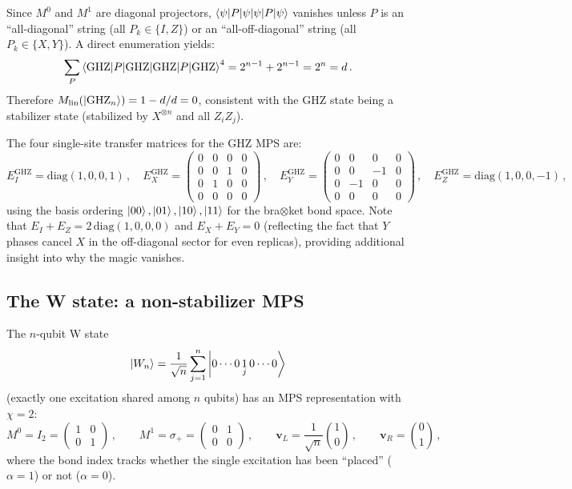 \documentclass[11pt,a4paper]{article}
\theoremstyle{definition}
\theoremstyle{remark}
\newcommand{\Mlin}{M_{\mathrm{lin}}}
\begin{document}
Since $M^0$ and $M^1$ are diagonal projectors, $\braket{\psi|P|\psi}$ vanishes unless $P$ is an ``all-diagonal'' string (all $P_k\in\{I,Z\}$) or an ``all-off-diagonal'' string (all $P_k\in\{X,Y\}$).
A direct enumeration yields:
\begin{equation}
  \sum_P \braket{\mathrm{GHZ}|P|\mathrm{GHZ}}^4 = 2^{n-1}+2^{n-1} = 2^n = d\,.
\end{equation}
Therefore $\Mlin(\ket{\mathrm{GHZ}_n}) = 1 - d/d = 0$, consistent with the GHZ state being a stabilizer state (stabilized by $X^{\otimes n}$ and all $Z_iZ_j$).

The four single-site transfer matrices for the GHZ MPS are:
\begin{equation}\label{eq:EP_GHZ}
  E_I^{\mathrm{GHZ}} = \mathrm{diag}(1,0,0,1)\,,\quad
  E_X^{\mathrm{GHZ}} = \begin{pmatrix} 0&0&0&0\\0&0&1&0\\0&1&0&0\\0&0&0&0\end{pmatrix}\,,\quad
  E_Y^{\mathrm{GHZ}} = \begin{pmatrix} 0&0&0&0\\0&0&-1&0\\0&-1&0&0\\0&0&0&0\end{pmatrix}\,,\quad
  E_Z^{\mathrm{GHZ}} = \mathrm{diag}(1,0,0,-1)\,,
\end{equation}
using the basis ordering $\ket{00},\ket{01},\ket{10},\ket{11}$ for the bra$\otimes$ket bond space.
Note that $E_I + E_Z = 2\,\mathrm{diag}(1,0,0,0)$ and $E_X + E_Y = 0$ (reflecting the fact that $Y$ phases cancel $X$ in the off-diagonal sector for even replicas), providing additional insight into why the magic vanishes.

\subsection{The W state: a non-stabilizer MPS}
\label{sec:W_state}

The $n$-qubit W state
\begin{equation}
  \ket{W_n} = \frac{1}{\sqrt{n}}\sum_{j=1}^n \ket{0\cdots 0\,\underset{j}{1}\,0\cdots 0}
\end{equation}
(exactly one excitation shared among $n$ qubits) has an MPS representation with $\chi=2$:
\begin{equation}\label{eq:W_mps}
  M^0 = I_2 = \begin{pmatrix}1&0\\0&1\end{pmatrix}\,,\qquad
  M^1 = \sigma_+ = \begin{pmatrix}0&1\\0&0\end{pmatrix}\,,\qquad
  \mathbf{v}_L = \frac{1}{\sqrt{n}}\binom{1}{0}\,,\qquad
  \mathbf{v}_R = \binom{0}{1}\,,
\end{equation}
where the bond index tracks whether the single excitation has been ``placed'' ($\alpha=1$) or not ($\alpha=0$).
\end{document}
